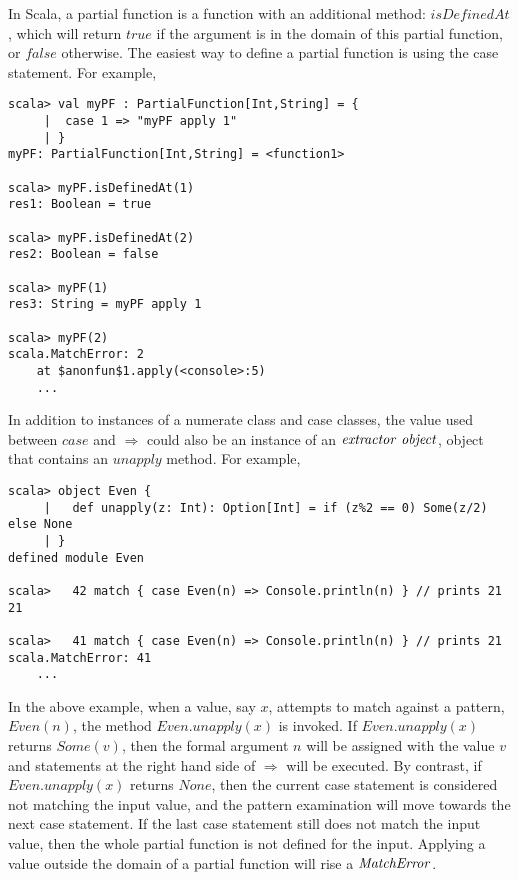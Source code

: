 In Scala, a partial function is a function with an additional method: $isDefinedAt$, which will return $true$ if the argument is in the domain of this partial function, or $false$ otherwise.  The easiest way to define a partial function is using the case statement.  For example,

\begin{lstlisting}
scala> val myPF : PartialFunction[Int,String] = {
     |  case 1 => "myPF apply 1"
     | }
myPF: PartialFunction[Int,String] = <function1>

scala> myPF.isDefinedAt(1)
res1: Boolean = true

scala> myPF.isDefinedAt(2)
res2: Boolean = false

scala> myPF(1)            
res3: String = myPF apply 1

scala> myPF(2)            
scala.MatchError: 2
	at $anonfun$1.apply(<console>:5)
	...
\end{lstlisting}

In addition to instances of a numerate class and case classes, the value used between $case$ and $\Rightarrow$ could also be an instance of an $\it{extractor\ object}$, object that contains an $unapply$ method\cite{extractors}.  For example,

\begin{lstlisting}
scala> object Even {
     |   def unapply(z: Int): Option[Int] = if (z%2 == 0) Some(z/2) else None
     | }
defined module Even

scala>   42 match { case Even(n) => Console.println(n) } // prints 21
21

scala>   41 match { case Even(n) => Console.println(n) } // prints 21
scala.MatchError: 41
	...
\end{lstlisting}

In the above example, when a value, say $x$, attempts to match against a pattern, $Even(n)$, the method $Even.unapply(x)$ is invoked.  If $Even.unapply(x)$ returns $Some(v)$, then the formal argument $n$ will be assigned with the value $v$ and statements at the right hand side of $\Rightarrow$ will be executed.  By contrast, if $Even.unapply(x)$ returns $None$, then the current case statement is considered not matching the input value, and the pattern examination will move towards the next case statement.  If the last case statement still does not match the input value, then the whole partial function is not defined for the input.  Applying a value outside the domain of a partial function will rise a $\it{MatchError}$.

